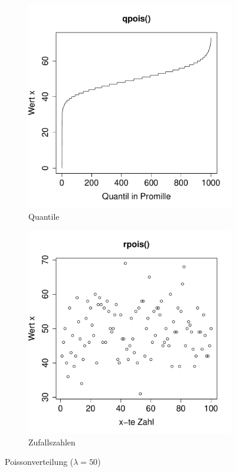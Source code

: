 \begin{figure}[h!]
\begin{subfigure}[b]{0.48\textwidth}
\includegraphics{verteilungen-035}
\caption{Quantile}
\end{subfigure}
\begin{subfigure}[b]{0.48\textwidth}
\includegraphics{verteilungen-036}
\caption{Zufallszahlen}
\end{subfigure}
\caption{Poissonverteilung ($\lambda=50$)}
\end{figure}

